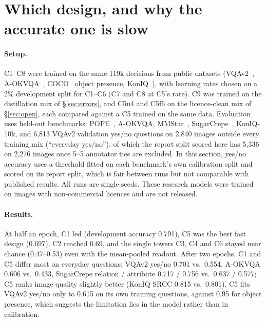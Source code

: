 \documentclass[10pt]{article}
\begin{document}
\section{Which design, and why the accurate one is slow}\label{sec:designs}
\paragraph{Setup.} C1--C8 were trained on the same 119k decisions from public datasets (VQAv2~\cite{vqav2}, A-OKVQA~\cite{aokvqa}, COCO~\cite{coco} object presence, KonIQ~\cite{koniq}), with learning rates chosen on a 2\% development split for C1--C6 (C7 and C8 at C5's rate). C9 was trained on the distillation mix of \S\ref{sec:errors}, and C5u4 and C5f6 on the licence-clean mix of \S\ref{sec:open}, each compared against a C5 trained on the same data. Evaluation uses held-out benchmarks: POPE~\cite{pope}, A-OKVQA, MMStar~\cite{mmstar}, SugarCrepe~\cite{sugarcrepe}, KonIQ-10k, and 6{,}813 VQAv2 validation yes/no questions on 2{,}840 images outside every training mix (``everyday yes/no''), of which the report split scored here has 5{,}336 on 2{,}276 images once 5--5 annotator ties are excluded. In this section, yes/no accuracy uses a threshold fitted on each benchmark's own calibration split and scored on its report split, which is fair between runs but not comparable with published results. All runs are single seeds. These research models were trained on images with non-commercial licences and are not released.

\paragraph{Results.} At half an epoch, C1 led (development accuracy 0.791), C5 was the best fast design (0.697), C2 reached 0.69, and the single towers C3, C4 and C6 stayed near chance (0.47--0.53) even with the mean-pooled readout. After two epochs, C1 and C5 differ most on everyday questions: VQAv2 yes/no 0.701 vs.\ 0.554, A-OKVQA 0.606 vs.\ 0.433, SugarCrepe relation / attribute 0.717 / 0.756 vs.\ 0.637 / 0.577; C5 ranks image quality slightly better (KonIQ SRCC 0.815 vs.\ 0.801). C5 fits VQAv2 yes/no only to 0.615 on its own training questions, against 0.95 for object presence, which suggests the limitation lies in the model rather than in calibration.
\end{document}

